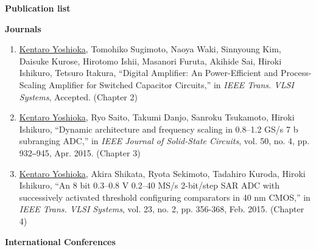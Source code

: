 \newpage 
\large{\textbf{Publication list}}

\large{\textbf{Journals}}
\normalsize
\begin{enumerate}
\item \underline{Kentaro Yoshioka}, Tomohiko Sugimoto, Naoya Waki, Sinnyoung Kim, Daisuke Kurose, Hirotomo Ishii, Masanori Furuta, Akihide Sai, Hiroki Ishikuro, Tetsuro Itakura, “Digital Amplifier: An Power-Efficient and Process-Scaling Amplifier for Switched Capacitor Circuits,” in \textit{IEEE Trans. VLSI Systems}, Accepted. (Chapter 2)
\item \underline{Kentaro Yoshioka}, Ryo Saito, Takumi Danjo, Sanroku Tsukamoto, Hiroki Ishikuro, “Dynamic architecture and frequency scaling in 0.8–1.2 GS/s 7 b subranging ADC,” in \textit{IEEE Journal of Solid-State Circuits}, vol. 50, no. 4, pp. 932‒945, Apr. 2015. (Chapter 3)
\item \underline{Kentaro Yoshioka}, Akira Shikata, Ryota Sekimoto, Tadahiro Kuroda, Hiroki Ishikuro, “An 8 bit 0.3–0.8 V 0.2–40 MS/s 2-bit/step SAR ADC with successively activated threshold configuring comparators in 40 nm CMOS,” in \textit{IEEE Trans. VLSI Systems}, vol. 23, no. 2, pp. 356-368, Feb. 2015. (Chapter 4)
\end{enumerate}

\large{\textbf{International Conferences}}
\normalsize

